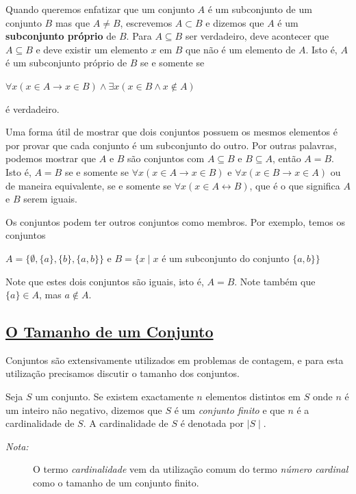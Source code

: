 Quando queremos enfatizar que um conjunto $A$ é um subconjunto de um conjunto
$B$ mas que $A \neq B$, escrevemos $A \subset B$ e dizemos que $A$ é um
\textbf{subconjunto próprio} de $B$. Para $A \subseteq B$ ser verdadeiro, deve
acontecer que $A \subseteq B$ e deve existir um elemento $x$ em $B$ que não é um
elemento de $A$. Isto é, $A$ é um subconjunto próprio de $B$ se e somente se
\begin{center}
$\forall x(x \in A \to x \in B) \land \exists x(x \in B \land x \notin A)$
\end{center}
é verdadeiro.

Uma forma útil de mostrar que dois conjuntos possuem os mesmos elementos é por
provar que cada conjunto é um subconjunto do outro. Por outras palavras, podemos
mostrar que $A$ e $B$ são conjuntos com $A \subseteq B$ e $B \subseteq A$, então
$A = B$. Isto é, $A=B$ se e somente se $\forall x(x \in A \to x \in B)$ e
$\forall x(x \in B \to x \in A)$ ou de maneira equivalente, se e somente se
$\forall x(x \in A \leftrightarrow B)$, que é o que significa $A$ e $B$ serem
iguais.


Os conjuntos podem ter outros conjuntos como membros. Por exemplo, temos os
conjuntos
\begin{center}
$A = \{\emptyset, \{a\}, \{b\}, \{a,b\}\}$ e $B = \{x \mid x$ é um subconjunto
do conjunto $\{a,b\}\}$
\end{center}
Note que estes dois conjuntos são iguais, isto é, $A = B$. Note também que
$\{a\} \in A$, mas $a \notin A$.

\subsection*{\underline{O Tamanho de um Conjunto}}

Conjuntos são extensivamente utilizados em problemas de contagem, e para esta
utilização precisamos discutir o tamanho dos conjuntos.

\begin{defn}
\label{def34}
Seja $S$ um conjunto. Se existem exactamente $n$ elementos distintos em $S$ onde
$n$ é um inteiro não negativo, dizemos que $S$ é um \emph{conjunto finito} e que
$n$ é a cardinalidade de $S$. A cardinalidade de $S$ é denotada por $\mid
S \mid$.
\begin{description}
\item[\emph{Nota:}] O termo \emph{cardinalidade} vem da utilização comum do
termo \emph{número cardinal} como o tamanho de um conjunto finito.
\end{description}
\end{defn}

